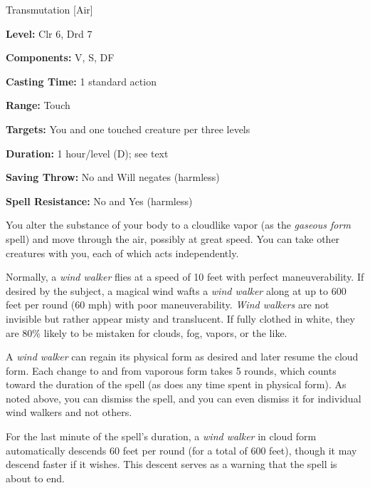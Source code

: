 
Transmutation [Air]

\textbf{Level:} Clr 6, Drd 7

\textbf{Components:} V, S, DF

\textbf{Casting Time:} 1 standard action

\textbf{Range:} Touch

\textbf{Targets:} You and one touched creature per three levels

\textbf{Duration:} 1 hour/level (D); see text

\textbf{Saving Throw:} No and Will negates (harmless)

\textbf{Spell Resistance:} No and Yes (harmless)

You alter the substance of your body to a cloudlike vapor (as the \textit{gaseous 
form} spell) and move through the air, possibly at great speed. You can take other 
creatures with you, each of which acts independently.

Normally, a \textit{wind walker} flies at a speed of 10 feet with perfect maneuverability. 
If desired by the subject, a magical wind wafts a \textit{wind walker} along at 
up to 600 feet per round (60 mph) with poor maneuverability. \textit{Wind walkers 
}are not invisible but rather appear misty and translucent. If fully clothed in 
white, they are 80\% likely to be mistaken for clouds, fog, vapors, or the like.

A \textit{wind walker} can regain its physical form as desired and later resume 
the cloud form. Each change to and from vaporous form takes 5 rounds, which counts 
toward the duration of the spell (as does any time spent in physical form). As 
noted above, you can dismiss the spell, and you can even dismiss it for individual 
wind walkers and not others.

For the last minute of the spell's duration, a \textit{wind walker} in cloud form 
automatically descends 60 feet per round (for a total of 600 feet), though it may 
descend faster if it wishes. This descent serves as a warning that the spell is 
about to end.

